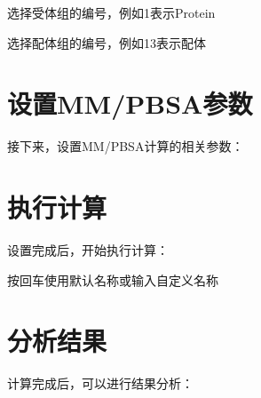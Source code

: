 \documentclass[letterpaper,10pt,english]{sphinxmanual}
\begin{document}
\begin{sphinxVerbatim}[commandchars=\\\{\}]
\PYG{o}{[}选择受体组的编号，例如1表示Protein\PYG{o}{]}

\PYG{o}{[}选择配体组的编号，例如13表示配体\PYG{o}{]}


\end{sphinxVerbatim}


\section{设置MM/PB\sphinxhyphen{}SA参数}
\label{\detokenize{quick_start:mm-pb-sa}}
\sphinxAtStartPar
接下来，设置MM/PB\sphinxhyphen{}SA计算的相关参数：

\begin{sphinxVerbatim}[commandchars=\\\{\}]

\end{sphinxVerbatim}


\section{执行计算}
\label{\detokenize{quick_start:id5}}
\sphinxAtStartPar
设置完成后，开始执行计算：

\begin{sphinxVerbatim}[commandchars=\\\{\}]
\PYG{o}{[}按回车使用默认名称或输入自定义名称\PYG{o}{]}

\end{sphinxVerbatim}


\section{分析结果}
\label{\detokenize{quick_start:id6}}
\sphinxAtStartPar
计算完成后，可以进行结果分析：
\end{document}
